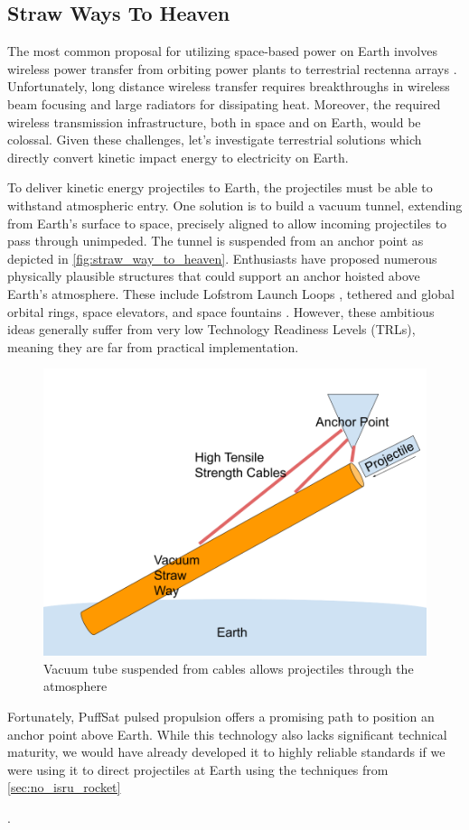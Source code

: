 \documentclass{article}
\begin{document}
{\subsection{Straw Ways To Heaven}\label{sec:straw_way_to_heaven}
The most common proposal for utilizing space-based power on Earth involves wireless power transfer from orbiting power plants to terrestrial rectenna arrays \cite{malaviya2022comprehensive}.  Unfortunately, long distance wireless transfer requires breakthroughs in wireless beam focusing \cite{space_beaming_power} and large radiators for dissipating heat. Moreover, the required wireless transmission infrastructure, both in space and on Earth, would be colossal.  Given these challenges, let's investigate terrestrial solutions which directly convert kinetic impact energy to electricity on Earth.

To deliver kinetic energy projectiles to Earth, the projectiles must be able to withstand atmospheric entry.  One solution is to build a vacuum tunnel, extending from Earth's surface to space, precisely aligned to allow incoming projectiles to pass through unimpeded.  The tunnel is suspended from an anchor point as depicted in \autoref{fig:straw_way_to_heaven}.   Enthusiasts have proposed numerous physically plausible structures that could support an anchor hoisted above Earth's atmosphere. These include Lofstrom Launch Loops \cite {lofstrom_loop}, tethered and global orbital rings, space elevators, and space fountains \cite{isaac_arthur_megastructure_complation}.  However, these ambitious ideas generally suffer from very low Technology Readiness Levels (TRLs), meaning they are far from practical implementation.

\begin{figure}[htpb]
    \centering
    \includegraphics[width=0.5\linewidth]{images/Straw Way To Heaven.png}
    \caption{Vacuum tube suspended from cables allows projectiles through the atmosphere}
    \label{fig:straw_way_to_heaven}
\end{figure}


Fortunately, PuffSat pulsed propulsion offers a promising path to position an anchor point above Earth. While this technology also lacks significant technical maturity, we would have already developed it to highly reliable standards if we were using it to direct projectiles at Earth using the techniques from \autoref{sec:no_isru_rocket}}.  
\end{document}
